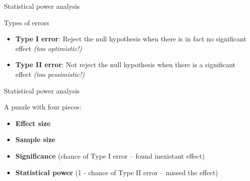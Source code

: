 \documentclass[compress]{beamer}
\begin{document}
\begin{frame}{Statistical power analysis}


    \begin{exampleblock}{Types of errors}
        \begin{itemize}
            \item \textbf{Type I error}: Reject the null hypothesis when there is in
                fact no significant effect \emph{(too optimistic!)}
            \item \textbf{Type II error}: Not reject the null hypothesis when there
                is a significant effect \emph{(too pessimistic!)}
        \end{itemize}
    \end{exampleblock}



\end{frame}

\begin{frame}{Statistical power analysis}

A puzzle with four pieces:

    \begin{itemize}
        \item \textbf{Effect size}
        \item \textbf{Sample size}
        \item \textbf{Significance} (chance of Type I error -- found inexistant
            effect)
        \item \textbf{Statistical power} (1 - chance of Type II error -- missed the effect)

    \end{itemize}
\end{frame}
\end{document}
